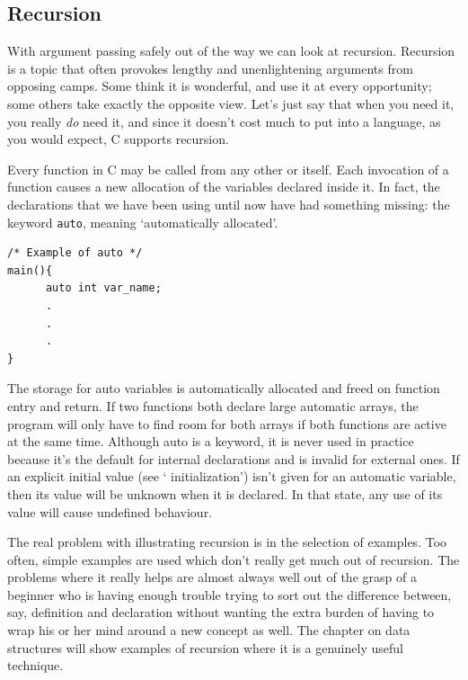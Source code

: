   

  \subsection{Recursion}
   

   With argument passing safely out of the way we can look at recursion.
    Recursion is a topic that often provokes lengthy and unenlightening
    arguments from opposing camps. Some think it is wonderful, and use it at
    every opportunity; some others take exactly the opposite view. Let's
    just say that when you need it, you really \textit{do} need it, and
    since it doesn't cost much to put into a language, as you would expect,
    C supports recursion.


   Every function in C may be called from any other or itself. Each
    invocation of a function causes a new allocation of the variables
    declared inside it. In fact, the declarations that we have been using
    until now have had something missing: the keyword \texttt{auto},
    meaning `automatically allocated'.

\begin{Verbatim}
/* Example of auto */
main(){
      auto int var_name;
      .
      .
      .
}
\end{Verbatim}

   The storage for auto variables is automatically allocated and freed on
    function entry and return. If two functions both declare large automatic
    arrays, the program will only have to find room for both arrays if both
    functions are active at the same time. Although auto is a keyword, it is
    never used in practice because it's the default for internal
    declarations and is invalid for external ones. If an explicit initial
    value (see ` initialization') isn't given for an automatic
    variable, then its value will be unknown when it is declared. In that
    state, any use of its value will cause undefined behaviour.


   The real problem with illustrating recursion is in the selection of
    examples. Too often, simple examples are used which don't really get
    much out of recursion. The problems where it really helps are almost
    always well out of the grasp of a beginner who is having enough trouble
    trying to sort out the difference between, say, definition and
    declaration without wanting the extra burden of having to wrap his or
    her mind around a new concept as well. The chapter on data structures
    will show examples of recursion where it is a genuinely useful
    technique.


